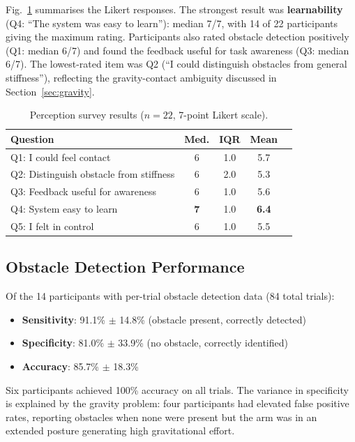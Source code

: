 \documentclass[conference]{IEEEtran}
\begin{document}
Fig.~\ref{fig:survey} summarises the Likert responses. The strongest result was \textbf{learnability} (Q4: ``The system was easy to learn''): median 7/7, with 14 of 22 participants giving the maximum rating. Participants also rated obstacle detection positively (Q1: median 6/7) and found the feedback useful for task awareness (Q3: median 6/7). The lowest-rated item was Q2 (``I could distinguish obstacles from general stiffness''), reflecting the gravity-contact ambiguity discussed in Section~\ref{sec:gravity}.

\begin{table}[t]
    \centering
    \caption{Perception survey results ($n = 22$, 7-point Likert scale).}
    \label{fig:survey}
    \small
    \begin{tabular}{@{}lcccc@{}}
        \toprule
        \textbf{Question} & \textbf{Med.} & \textbf{IQR} & \textbf{Mean} \\
        \midrule
        Q1: I could feel contact & 6 & 1.0 & 5.7 \\
        Q2: Distinguish obstacle from stiffness & 6 & 2.0 & 5.3 \\
        Q3: Feedback useful for awareness & 6 & 1.0 & 5.6 \\
        Q4: System easy to learn & \textbf{7} & 1.0 & \textbf{6.4} \\
        Q5: I felt in control & 6 & 1.0 & 5.5 \\
        \bottomrule
    \end{tabular}
\end{table}

\subsection{Obstacle Detection Performance}

Of the 14 participants with per-trial obstacle detection data (84 total trials):

\begin{itemize}
    \item \textbf{Sensitivity}: 91.1\% $\pm$ 14.8\% (obstacle present, correctly detected)
    \item \textbf{Specificity}: 81.0\% $\pm$ 33.9\% (no obstacle, correctly identified)
    \item \textbf{Accuracy}: 85.7\% $\pm$ 18.3\%
\end{itemize}

Six participants achieved 100\% accuracy on all trials. The variance in specificity is explained by the gravity problem: four participants had elevated false positive rates, reporting obstacles when none were present but the arm was in an extended posture generating high gravitational effort.
\end{document}
